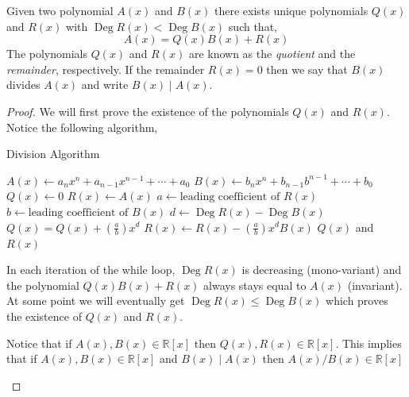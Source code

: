 \documentclass[11pt,numbers=noenddot,svgnames,dvipsnames]{scrartcl}
\DeclareMathOperator{\Deg}{Deg}
\begin{document}
\begin{theorem}\label{thm:division-algorithm}
    Given two polynomial $A(x)$ and $B(x)$ there exists unique polynomials $Q(x)$ and $R(x)$ with $\Deg R(x) < \Deg B(x)$ 
    such that,
    \[
        A(x) = Q(x)B(x) + R(x)
    \]
    The polynomials $Q(x)$ and $R(x)$ are known as the \textit{quotient} and the \textit{remainder}, respectively. If the 
    remainder $R(x)=0$ then we say that $B(x)$ divides $A(x)$ and write $B(x) \mid A(x)$.
\end{theorem}
\begin{proof}
    We will first prove the existence of the polynomials $Q(x)$ and $R(x)$. 
    Notice the following algorithm,
    \begin{algorithm}
    \caption{Division Algorithm}
    \begin{algorithmic}
        \State $A(x) \gets a_{n}x^{n} + a_{n-1}x^{n-1}+\cdots+a_{0}$
        \State $B(x) \gets b_{n}x^{n} + b_{n-1}b^{n-1}+\cdots+b_{0}$
        \State $Q(x) \gets 0$
        \State $R(x) \gets A(x)$
        \While{$\Deg R(x) \geq \Deg B(x)$}
            \State $a \gets \text{leading coefficient of }R(x)$
            \State $b \gets \text{leading coefficient of }B(x)$
            \State $d \gets \Deg R(x) - \Deg B(x)$
            \State $Q(x) = Q(x) + \left(\frac{a}{b}\right)x^{d}$
            \State $R(x) \gets R(x) - \left(\frac{a}{b}\right)x^{d}B(x)$
        \EndWhile
        \Output $Q(x)$ and $R(x)$
    \end{algorithmic}
    \end{algorithm}

    In each iteration of the while loop, $\Deg R(x)$ is decreasing (mono-variant) and 
    the polynomial $Q(x)B(x) + R(x)$ always stays equal to $A(x)$ (invariant). 
    At some point we will eventually get $\Deg R(x) \leq \Deg B(x)$ which proves the existence of $Q(x)$ and $R(x)$.

    \begin{remark}
        Notice that if $A(x), B(x) \in \mathbb{R}[x]$ then $Q(x), R(x) \in \mathbb{R}[x]$. This implies that 
        if $A(x), B(x) \in \mathbb{R}[x]$ and $B(x)\mid A(x)$ then $A(x)/B(x) \in \mathbb{R}[x]$
    \end{remark}


\end{proof}
\end{document}
